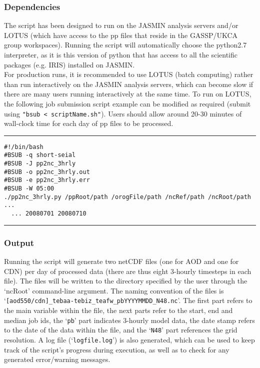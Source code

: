 \documentclass[10pt,a4paper]{article}
\begin{document}
\subsubsection{Dependencies}
The script has been designed to run on the JASMIN analysis servers and/or LOTUS (which have access to the pp files that reside in the GASSP/UKCA group workspaces). Running the script will automatically choose the python2.7 interpreter, as it is this version of python that has access to all the scientific packages (e.g. IRIS) installed on JASMIN.\\
For production runs, it is recommended to use LOTUS (batch computing) rather than run interactively on the JASMIN analysis servers, which can become slow if there are many users running interactively at the same time. To run on LOTUS, the following job submission script example can be modified as required (submit using \texttt{"bsub < scriptName.sh"}). Users should allow around 20-30 minutes of wall-clock time for each day of pp files to be processed.\\
\hrule
\begin{spacing}{1}
\begin{lstlisting}
#!/bin/bash
#BSUB -q short-seial
#BSUB -J pp2nc_3hrly
#BSUB -o pp2nc_3hrly.out 
#BSUB -e pp2nc_3hrly.err 
#BSUB -W 05:00
./pp2nc_3hrly.py /ppRoot/path /orogFile/path /ncRef/path /ncRoot/path ...
  ... 20080701 20080710
\end{lstlisting}
\end{spacing}
\hrule

\subsubsection{Output}
Running the script will generate two netCDF files (one for AOD and one for CDN) per day of processed data (there are thus eight 3-hourly timesteps in each file). The files will be written to the directory specified by the user through the `ncRoot' command-line argument. The naming convention of the files is `\texttt{[aod550/cdn]\_tebaa-tebiz\_teafw\_pbYYYYMMDD\_N48.nc}'. The first part refers to the main variable within the file, the next parts refer to the start, end and median job ids, the `\texttt{pb}' part indicates 3-hourly model data, the date stamp refers to the date of the data within the file, and the `\texttt{N48}' part references the grid resolution. A log file (`\texttt{logfile.log}') is also generated, which can be used to keep track of the script's progress during execution, as well as to check for any generated error/warning messages.
\end{document}
